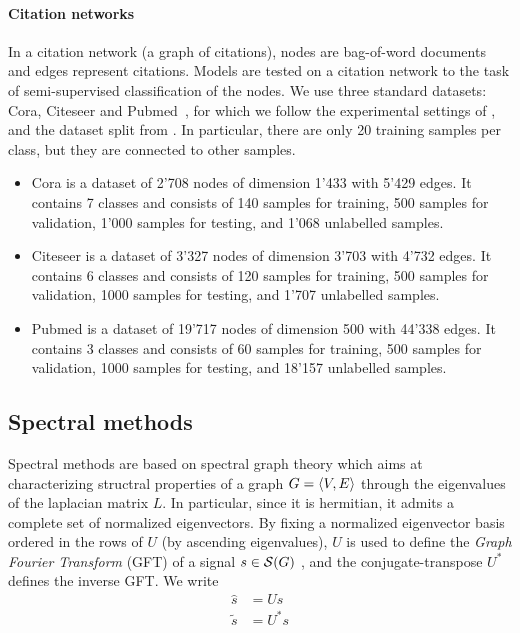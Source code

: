 \paragraph{Citation networks}
In a citation network (\ie a graph of citations), nodes are bag-of-word documents and edges represent citations. Models are tested on a citation network to the task of semi-supervised classification of the nodes. We use three standard datasets: Cora, Citeseer and Pubmed~\citep{sen2008collective}, for which we follow the experimental settings of \cite{yang2016revisiting}, and the dataset split from \cite{kipf2016semi}. In particular, there are only 20 training samples per class, but they are connected to other samples.
\begin{itemize}
  \item Cora is a dataset of 2'708 nodes of dimension 1'433 with 5'429 edges. It contains 7 classes and consists of 140 samples for training, 500 samples for validation, 1'000 samples for testing, and 1'068 unlabelled samples.
  \item Citeseer is a dataset of 3'327 nodes of dimension 3'703 with 4'732 edges. It contains 6 classes and consists of 120 samples for training, 500 samples for validation, 1000 samples for testing, and 1'707 unlabelled samples.
  \item Pubmed is a dataset of 19'717 nodes of dimension 500 with 44'338 edges. It contains 3 classes and consists of 60 samples for training, 500 samples for validation, 1000 samples for testing, and 18'157 unlabelled samples.
\end{itemize}


\subsection{Spectral methods}
\label{sec:spec}

Spectral methods are based on spectral graph theory \citep{chung1996spectral} which aims at characterizing structral properties of a graph $G = \langle V, E \rangle$ through the eigenvalues of the laplacian matrix $L$. In particular, since it is hermitian, it admits a complete set of normalized eigenvectors. By fixing a normalized eigenvector basis ordered in the rows of $U$ (by ascending eigenvalues), $U$ is used to define the \emph{Graph Fourier Transform} (GFT) of a signal $s \in \mathcal{S}(G)$ \citep{shuman2013emerging}, and the conjugate-transpose $U^*$ defines the inverse GFT. We write
\begin{align}
\widehat{s} &= Us\\
\widetilde{s} &= U^*s
\end{align}

